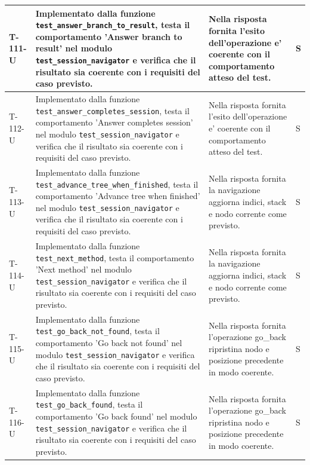 \documentclass[a4paper,12pt]{article}
\begin{document}
{{\begin{longtable}{|>{\RaggedRight\arraybackslash}p{1.55cm}|>{\RaggedRight\arraybackslash}p{8.0cm}|>{\RaggedRight\arraybackslash}p{4.6cm}|>{\RaggedRight\arraybackslash}p{1.2cm}|}
        \hline
        T-111-U & Implementato dalla funzione \texttt{test\_\allowbreak answer\_\allowbreak branch\_\allowbreak to\_\allowbreak result}, testa il comportamento 'Answer branch to result' nel modulo \texttt{test\_\allowbreak session\_\allowbreak navigator} e verifica che il risultato sia coerente con i requisiti del caso previsto. & Nella risposta fornita l'esito dell'operazione e' coerente con il comportamento atteso del test. & S \\
        \hline
        T-112-U & Implementato dalla funzione \texttt{test\_\allowbreak answer\_\allowbreak completes\_\allowbreak session}, testa il comportamento 'Answer completes session' nel modulo \texttt{test\_\allowbreak session\_\allowbreak navigator} e verifica che il risultato sia coerente con i requisiti del caso previsto. & Nella risposta fornita l'esito dell'operazione e' coerente con il comportamento atteso del test. & S \\
        \hline
        T-113-U & Implementato dalla funzione \texttt{test\_\allowbreak advance\_\allowbreak tree\_\allowbreak when\_\allowbreak finished}, testa il comportamento 'Advance tree when finished' nel modulo \texttt{test\_\allowbreak session\_\allowbreak navigator} e verifica che il risultato sia coerente con i requisiti del caso previsto. & Nella risposta fornita la navigazione aggiorna indici, stack e nodo corrente come previsto. & S \\
        \hline
        T-114-U & Implementato dalla funzione \texttt{test\_\allowbreak next\_\allowbreak method}, testa il comportamento 'Next method' nel modulo \texttt{test\_\allowbreak session\_\allowbreak navigator} e verifica che il risultato sia coerente con i requisiti del caso previsto. & Nella risposta fornita la navigazione aggiorna indici, stack e nodo corrente come previsto. & S \\
        \hline
        T-115-U & Implementato dalla funzione \texttt{test\_\allowbreak go\_\allowbreak back\_\allowbreak not\_\allowbreak found}, testa il comportamento 'Go back not found' nel modulo \texttt{test\_\allowbreak session\_\allowbreak navigator} e verifica che il risultato sia coerente con i requisiti del caso previsto. & Nella risposta fornita l'operazione go\_back ripristina nodo e posizione precedente in modo coerente. & S \\
        \hline
        T-116-U & Implementato dalla funzione \texttt{test\_\allowbreak go\_\allowbreak back\_\allowbreak found}, testa il comportamento 'Go back found' nel modulo \texttt{test\_\allowbreak session\_\allowbreak navigator} e verifica che il risultato sia coerente con i requisiti del caso previsto. & Nella risposta fornita l'operazione go\_back ripristina nodo e posizione precedente in modo coerente. & S \\

\end{longtable}}}
\end{document}
